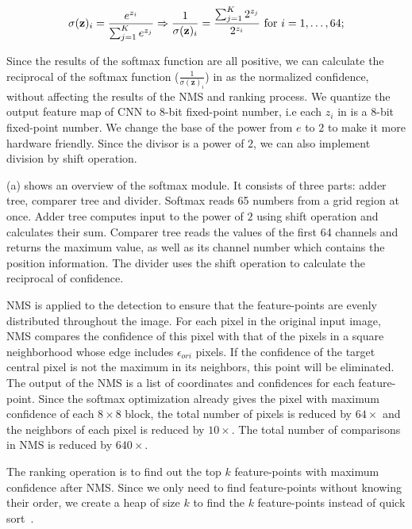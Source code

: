 \begin{equation}
 \small
 \sigma (\mathbf {z} )_{i}={\frac {e^{z_{i}}}{\sum _{j=1}^{K}e^{z_{j}}}}
 \Rightarrow
 \frac{1}{\sigma (\mathbf {z} )_{i}}={\frac {\sum _{j=1}^{K}2^{z_{j}}}{2^{z_{i}}}}{\text{ for }}i=1,\dotsc ,64;
 \label{equ:softmax_hard}
\end{equation}

Since the results of the softmax function are all positive, we can calculate the reciprocal of the softmax function ($\frac{1}{\sigma (\mathbf {z} )_{i}}$) in  as the normalized confidence, without affecting the results of the NMS and ranking process. We quantize the output feature map of CNN to 8-bit fixed-point number, i.e each $z_i$ in  is a 8-bit fixed-point number. We change the base of the power from $e$ to $2$ to make it more hardware friendly. Since the divisor is a power of $2$, we can also implement division by shift operation.

(a) shows an overview of the softmax module. It consists of three parts: adder tree, comparer tree and divider. Softmax reads 65 numbers from a grid region at once. Adder tree computes input to the power of $2$ using shift operation and calculates their sum. Comparer tree reads the values of the first 64 channels and returns the maximum value, as well as its channel number which contains the position information. The divider uses the shift operation to calculate the reciprocal of confidence.

NMS is applied to the detection to ensure that the feature-points are evenly distributed throughout the image. 
For each pixel in the original input image, NMS compares the confidence of this pixel with that of the pixels in a square neighborhood whose edge includes $\epsilon _{ori}$ pixels. 
If the confidence of the target central pixel is not the maximum in its neighbors, this point will be eliminated. 
The output of the NMS is a list of coordinates and confidences for each feature-point. 
Since the softmax optimization already gives the pixel with maximum confidence of each $8 \times 8$ block, the total number of pixels is reduced by $64 \times$ and the neighbors of each pixel is reduced by $10 \times$.
The total number of comparisons in NMS is reduced by $640\times$.

The ranking operation is to find out the top $k$ feature-points with maximum confidence after NMS. 
Since we only need to find feature-points without knowing their order, we create a heap of size $k$ to find the $k$ feature-points instead of quick sort~\cite{Niu2012Top}.


